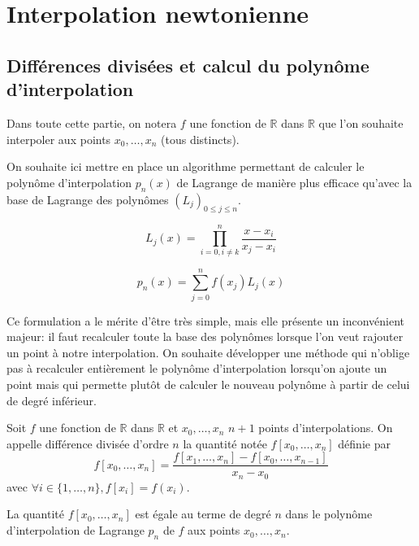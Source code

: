
\chapter{Interpolation newtonienne}

\section{Différences divisées et calcul du polynôme d'interpolation}

Dans toute cette partie, on notera $f$ une fonction de $\mathbb{R}$ 
dans $\mathbb{R}$ que l'on souhaite interpoler aux points 
$x_0, \dots, x_n$ (tous distincts).

On souhaite ici mettre en place un algorithme 
permettant de calculer le polynôme d'interpolation $p_n(x)$ de Lagrange 
de manière plus efficace qu'avec la base de Lagrange des polynômes
$(L_j)_{0 \leq j \leq n}$. 

\[
L_j(x) = \prod_{i = 0, i \neq k}^{n} \frac{x-x_i}{x_j -x_i}
\] 

\[
p_n(x) = \sum_{j=0}^{n} f(x_j) L_j(x)
\] 

Ce formulation a le mérite d'être très simple, mais elle 
présente un inconvénient majeur: il faut recalculer toute la 
base des polynômes lorsque l'on veut rajouter un point à 
notre interpolation. On souhaite développer une méthode qui 
n'oblige pas à recalculer entièrement le polynôme 
d'interpolation lorsqu'on ajoute un point mais qui permette 
plutôt de calculer le nouveau polynôme à partir de celui de 
degré inférieur.

\begin{definition}
Soit $f$ une fonction de  $\mathbb{R}$ dans $\mathbb{R}$ et 
$x_0, \dots, x_n$ $n+1$ points d'interpolations. On appelle 
différence divisée d'ordre $n$ la quantité notée 
$f[x_0, \dots, x_n]$ définie par 
\[
f[x_0, \dots, x_n] = \frac{f[x_1, \dots, x_n] - f[x_0, \dots, x_{n-1}]}{x_n - x_0}
\]
avec $\forall i \in \{1, \dots, n\}, f[x_i] = f(x_i)$.
\end{definition}

\begin{proposition}
La quantité $f[x_0, \dots, x_n]$ est égale au terme de degré 
$n$ dans le polynôme d'interpolation de Lagrange $p_n$ de $f$ aux points $x_0, \dots, x_n$.
\end{proposition}

